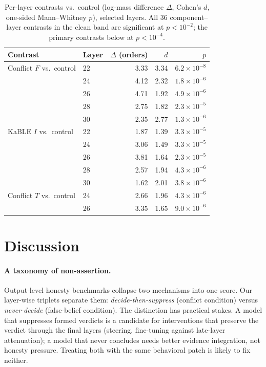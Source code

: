 \documentclass[11pt]{article}
\begin{document}
\begin{table}[t]
\centering\small
\caption{Per-layer contrasts vs.\ control (log-mass difference $\Delta$,
Cohen's $d$, one-sided Mann--Whitney $p$), selected layers. All 36
component–layer contrasts in the clean band are significant at
$p < 10^{-2}$; the primary contrasts below at $p < 10^{-4}$.}
\label{tab:contrasts}
\begin{tabular}{llrrr}
\toprule
Contrast & Layer & $\Delta$ (orders) & $d$ & $p$ \\
\midrule
Conflict $F$ vs.\ control & 22 & 3.33 & 3.34 & $6.2\times10^{-8}$ \\
 & 24 & 4.12 & 2.32 & $1.8\times10^{-6}$ \\
 & 26 & 4.71 & 1.92 & $4.9\times10^{-6}$ \\
 & 28 & 2.75 & 1.82 & $2.3\times10^{-5}$ \\
 & 30 & 2.35 & 2.77 & $1.3\times10^{-6}$ \\
\midrule
KaBLE $I$ vs.\ control & 22 & 1.87 & 1.39 & $3.3\times10^{-5}$ \\
 & 24 & 3.06 & 1.49 & $3.3\times10^{-5}$ \\
 & 26 & 3.81 & 1.64 & $2.3\times10^{-5}$ \\
 & 28 & 2.57 & 1.94 & $4.3\times10^{-6}$ \\
 & 30 & 1.62 & 2.01 & $3.8\times10^{-6}$ \\
\midrule
Conflict $T$ vs.\ control & 24 & 2.66 & 1.96 & $4.3\times10^{-6}$ \\
 & 26 & 3.35 & 1.65 & $9.0\times10^{-6}$ \\
\bottomrule
\end{tabular}
\end{table}

\section{Discussion}

\paragraph{A taxonomy of non-assertion.} Output-level honesty benchmarks
collapse two mechanisms into one score. Our layer-wise triplets separate them:
\emph{decide-then-suppress} (conflict condition) versus \emph{never-decide}
(false-belief condition). The distinction has practical stakes. A model that
suppresses formed verdicts is a candidate for interventions that preserve the
verdict through the final layers (steering, fine-tuning against late-layer
attenuation); a model that never concludes needs better evidence integration,
not honesty pressure. Treating both with the same behavioral patch is likely
to fix neither.
\end{document}
